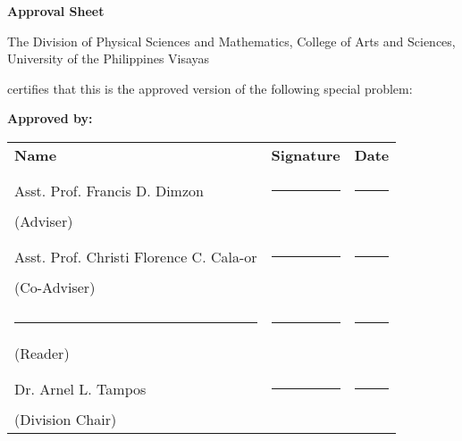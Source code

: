 \begin{center}
\textbf{Approval Sheet}
	
The Division of Physical Sciences and Mathematics, College of Arts and Sciences, University of the Philippines Visayas 

certifies that this is the approved version of the following special problem:

\end{center}

{\small\textbf{Approved by:}}

\newcommand{\signaturerule}{\rule{10em}{.4pt}}
	\begin{tabular}{lll}
		\bfseries Name  & \bfseries Signature & \bfseries Date\\ \\
		Asst. Prof. Francis D. Dimzon &\signaturerule  & \signaturerule\\ 
		(Adviser)\\ \\
		Asst. Prof. Christi Florence C. Cala-or &\signaturerule &\signaturerule\\
		(Co-Adviser)\\ \\
		\signaturerule &\signaturerule &\signaturerule\\
		(Reader)\\ \\
		Dr. Arnel L. Tampos &\signaturerule &\signaturerule\\
		(Division Chair)
		
	\end{tabular}
